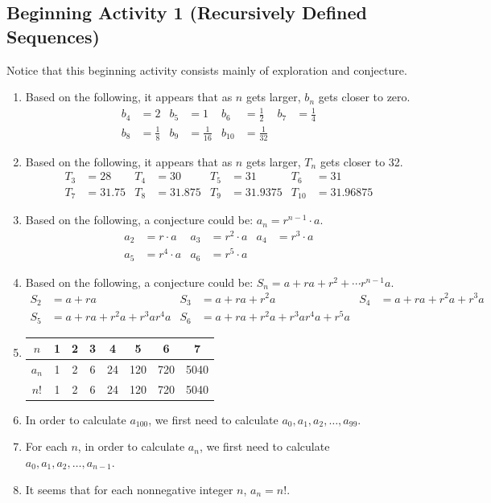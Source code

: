 \documentclass[11pt]{article}
\begin{document}
\subsection*{Beginning Activity 1 (Recursively Defined Sequences)}
Notice that this beginning activity consists mainly of exploration and conjecture.

\begin{enumerate} 
  \item Based on the following, it appears that as $n$ gets larger, $b_n$ gets closer to zero.
\begin{align*}
b_4 &= 2   & b_5 &= 1 &  b_6 &= \frac{1}{2} &  b_7 &= \frac{1}{4} \\
b_8 &= \frac{1}{8} &  b_9 &= \frac{1}{16}  &  b_{10} &= \frac{1}{32} 
\end{align*}
  \item Based on the following, it appears that as $n$ gets larger, $T_n$ gets closer to 32.
\begin{align*}
T_3 &= 28  &  T_4 &= 30   & T_5 &= 31 &  T_6 &= 31  \\
T_7 &= 31.75 & T_8 &= 31.875 &  T_9 &= 31.9375  &  T_{10} &= 31.96875 
\end{align*}

\item Based on the following, a conjecture could be:  $a_n = r^{n-1} \cdot a$.
\begin{align*}
a_2 &= r \cdot a  &  a_3 &= r^2 \cdot a & a_4 &= r^3 \cdot a \\
a_5 &= r^4 \cdot a & a_6 &= r^5 \cdot a
\end{align*}

\item Based on the following, a conjecture could be:  $S_n = a + ra + r^2 + \cdots r^{n-1} a$.
\begin{align*}
S_2 &= a + ra  &  S_3 &= a + ra + r^2 a  &  S_4 &= a + ra + r^2 a + r^3 a \\
S_5 &= a + ra + r^2 a + r^3 a r^4 a & S_6 &= a + ra + r^2 a + r^3 a r^4 a + r^5 a
\end{align*}

\item
\begin{tabular}[t]{| c | c | c | c | c | c | c | c |} \hline
$n$  &  1  &  2  &  3  &  4  &  5  &  6  &  7  \\ \hline
$a_n$ &  1  &  2  &  6  &  24  &  120  &  720  &  5040  \\ \hline
$n!$  &  1  &  2  &  6  &  24  &  120  &  720  &  5040  \\ \hline
\end{tabular}

\item In order to calculate  $a_{100} $, we first need to calculate  
$a_0 , a_1 , a_2 ,  \ldots , a_{99} $.

\item For each  $n$,  in order to calculate  $a_n $, we first need to calculate  
$a_0 , a_1 , a_2 , \ldots , a_{n - 1} $.

\item It seems that for each nonnegative integer  $n$,  $a_n  = n!$.

\end{enumerate}
\hbreak
\end{document}
